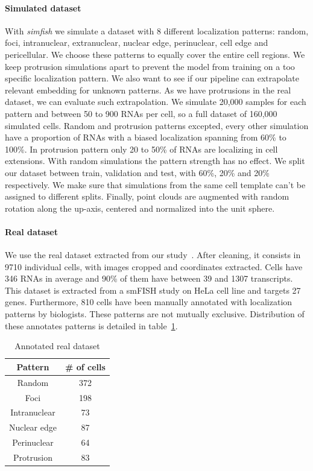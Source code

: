 \paragraph{Simulated dataset}

With \emph{simfish} we simulate a dataset with 8 different localization patterns: random, foci, intranuclear, extranuclear, nuclear edge, perinuclear, cell edge and pericellular.
We choose these patterns to equally cover the entire cell regions.
We keep protrusion simulations apart to prevent the model from training on a too specific localization pattern.
We also want to see if our pipeline can extrapolate relevant embedding for unknown patterns.
As we have protrusions in the real dataset, we can evaluate such extrapolation.
We simulate 20,000 samples for each pattern and between 50 to 900 \ac{RNA}s per cell, so a full dataset of 160,000 simulated cells.
Random and protrusion patterns excepted, every other simulation have a proportion of \ac{RNA}s with a biased localization spanning from 60\% to 100\%.
In protrusion pattern only 20 to 50\% of \ac{RNA}s are localizing in cell extensions.
With random simulations the pattern strength has no effect.
We split our dataset between train, validation and test, with 60\%, 20\% and 20\% respectively.
We make sure that simulations from the same cell template can't be assigned to different splits.
Finally, point clouds are augmented with random rotation along the up-axis, centered and normalized into the unit sphere.

\paragraph{Real dataset}

We use the real dataset extracted from our study~\cite{CHOUAIB_2020}.
After cleaning, it consists in 9710 individual cells, with images cropped and coordinates extracted.
Cells have 346 \ac{RNA}s in average and 90\% of them have between 39 and 1307 transcripts.
This dataset is extracted from a \ac{smFISH} study on HeLa cell line and targets 27 genes.
Furthermore, 810 cells have been manually annotated with localization patterns by biologists.
These patterns are not mutually exclusive.
Distribution of these annotates patterns is detailed in table~\ref{table:real_dataset}.

\begin{table}
	\centering
	\begin{tabular}{| c | c |}
		\hline
		Pattern & \# of cells \\
		\hline
		Random & 372\\
		Foci & 198\\
		Intranuclear & 73\\
		Nuclear edge & 87\\
		Perinuclear & 64\\
		Protrusion & 83\\
		\hline
	\end{tabular}
	\caption{Annotated real dataset}
	\label{table:real_dataset}
\end{table}

